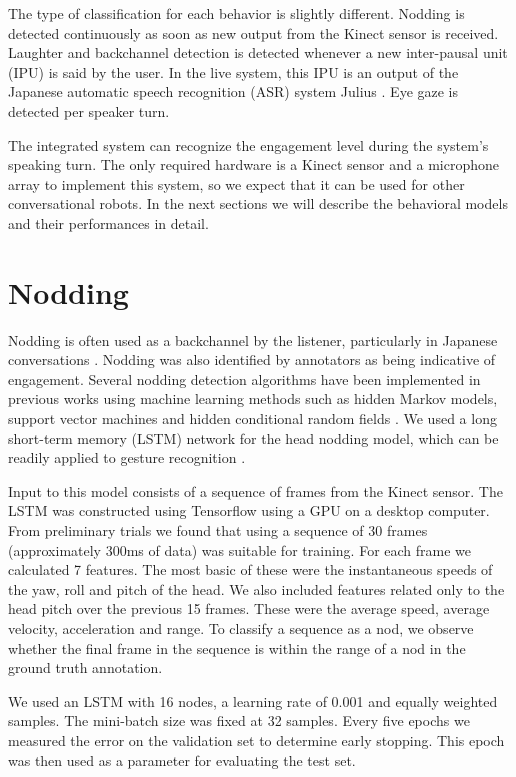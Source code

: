 \documentclass[letterpaper]{article} %
\begin{document}
The type of classification for each behavior is slightly different. Nodding is detected continuously as soon as new output from the Kinect sensor is received. Laughter and backchannel detection is detected whenever a new inter-pausal unit (IPU) is said by the user. In the live system, this IPU is an output of the Japanese automatic speech recognition (ASR) system Julius \cite{Lee01}. Eye gaze is detected per speaker turn.

The integrated system can recognize the engagement level during the system's speaking turn. The only required hardware is a Kinect sensor and a microphone array to implement this system, so we expect that it can be used for other conversational robots. In the next sections we will describe the behavioral models and their performances in detail.

\section{Nodding}
Nodding is often used as a backchannel by the listener, particularly in Japanese conversations \cite{Maynard1987,Hanzawa2012}. Nodding was also identified by annotators as being indicative of engagement. Several nodding detection algorithms have been implemented in previous works using machine learning methods such as hidden Markov models, support vector machines and hidden conditional random fields \cite{Fujie2004,Morency2005,Wang2006}. We used a long short-term memory (LSTM) network \cite{Hochreiter1997} for the head nodding model, which can be readily applied to gesture recognition \cite{Ordonez2016}.

Input to this model consists of a sequence of frames from the Kinect sensor. The LSTM was constructed using Tensorflow using a GPU on a desktop computer. From preliminary trials we found that using a sequence of 30 frames (approximately 300ms of data) was suitable for training. For each frame we calculated 7 features. The most basic of these were the instantaneous speeds of the yaw, roll and pitch of the head. We also included features related only to the head pitch over the previous 15 frames. These were the average speed, average velocity, acceleration and range. To classify a sequence as a nod, we observe whether the final frame in the sequence is within the range of a nod in the ground truth annotation.

We used an LSTM with 16 nodes, a learning rate of 0.001 and equally weighted samples. The mini-batch size was fixed at 32 samples. Every five epochs we measured the error on the validation set to determine early stopping. This epoch was then used as a parameter for evaluating the test set.
\end{document}
